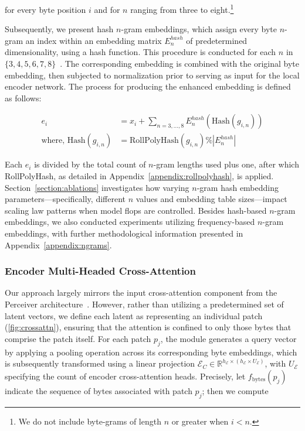 for every byte position $i$ and for $n$ ranging from three to eight.\footnote{
We do not include byte-grams of length $n$ or greater when $i<n$. }

Subsequently, we present hash $n$-gram embeddings, which assign every byte $n$-gram an index within an embedding matrix $E_{n}^{hash}$ of predetermined dimensionality, using a hash function. This procedure is conducted for each $n$ in $\{3,4,5,6,7,8\}$~\citep{bai2010learning}. The corresponding embedding is combined with the original byte embedding, then subjected to normalization prior to serving as input for the local encoder network. The process for producing the enhanced embedding is defined as follows:

\begin{align}
e_i &= x_i + \sum_{n = 3,...,8}E_{n}^{hash}(\text{Hash}(g_{i,n})) \\
\text{where, Hash}(g_{i,n}) &= \text{RollPolyHash}(g_{i,n}) \% |E_{n}^{hash}|
\end{align}

Each $e_i$ is divided by the total count of $n$-gram lengths used plus one, after which RollPolyHash, as detailed in Appendix~\ref{appendix:rollpolyhash}, is applied. Section~\ref{section:ablations} investigates how varying $n$-gram hash embedding parameters—specifically, different $n$ values and embedding table sizes—impact scaling law patterns when model flops are controlled. Besides hash-based $n$-gram embeddings, we also conducted experiments utilizing frequency-based $n$-gram embeddings, with further methodological information presented in Appendix~\ref{appendix:ngrams}.

\subsubsection{Encoder Multi-Headed Cross-Attention}
\label{sec:enc-cross-attn}
Our approach largely mirrors the input cross-attention component from the Perceiver architecture~\citep{jaegle2021perceiver}. However, rather than utilizing a predetermined set of latent vectors, we define each latent as representing an individual patch (\autoref{fig:crossattn}), ensuring that the attention is confined to only those bytes that comprise the patch itself. For each patch $p_j$, the module generates a query vector by applying a pooling operation across its corresponding byte embeddings, which is subsequently transformed using a linear projection $\mathcal{E}_{C} \in \mathbb{R}^{h_{\mathcal{E}} \times (h_{\mathcal{E}} \times U_{\mathcal{E}})}$, with $U_{\mathcal{E}}$ specifying the count of encoder cross-attention heads. Precisely, let $f_{\text{bytes}}(p_j)$ indicate the sequence of bytes associated with patch $p_j$; then we compute

